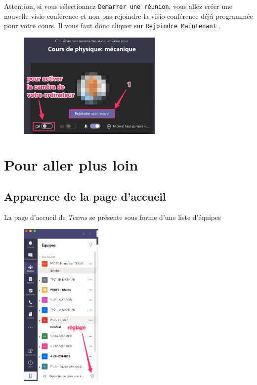 Attention, si vous sélectionnez \texttt{Demarrer une réunion}, vous allez créer une nouvelle visio-conférence et non pas rejoindre la visio-conférence déjà programmée pour votre cours. Il vous faut donc cliquer sur \texttt{Rejoindre Maintenant} .

\begin{figure}[H]
\includegraphics[width=7cm]{./images/teams/video2}
\centering
\end{figure}





\section{Pour aller plus loin}
\subsection{Apparence de la page d'accueil}

La page d'accueil de \emph{Teams} se présente sous forme d'une liste d'équipes

\begin{figure}[H]
\includegraphics[width=4cm]{./images/teams/accueil_liste}
\centering
\end{figure}

